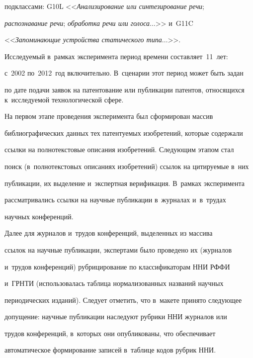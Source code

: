 подклассами: G10L <<\textit{Анализирование или синтезирование речи}; 


\textit{распознавание речи}; \textit{обработка речи или голоса}$\ldots$>> и~G11C 


<<\textit{Запоминающие устройства статического типа}$\ldots$>>. 


Исследуемый в~рамках эксперимента период времени составляет~11~лет: 


с~2002 по~2012~год включительно. В~сценарии этот период может быть задан 


по дате подачи заявок на патентование или публикации патентов, относящихся к~исследуемой технологической сфере.


     


     На первом этапе проведения эксперимента был сформирован массив 


библиографических данных тех патентуемых изобретений, которые содержали 


ссылки на полнотекстовые описания изобретений. Следующим этапом стал 


поиск (в~полнотекстовых описаниях изобретений) ссылок на цитируемые в~них 


публикации, их выделение и~экспертная верификация. В~рамках эксперимента 


рассматривались ссылки на научные публикации в~журналах и~в~трудах 


научных конференций.


     


     Далее для журналов и~трудов конференций, выделенных из массива 


ссылок на научные публикации, экспертами было проведено их (журналов 


и~трудов конференций) рубрицирование по классификаторам ННИ РФФИ 


и~ГРНТИ (использовалась таблица нормализованных названий научных 


периодических изданий). Следует отметить, что в~макете принято следующее 


допущение: научные публикации наследуют рубрики ННИ журналов или 


трудов конференций, в~которых они опубликованы, что обеспечивает 


автоматическое формирование записей в~таблице кодов рубрик ННИ.


     


